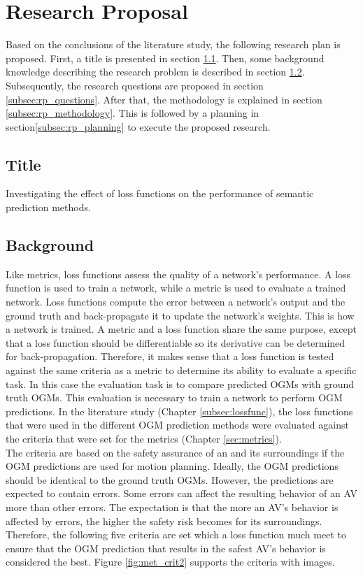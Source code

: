 \section{Research Proposal} \label{sec:res_prop}
Based on the conclusions of the literature study, the following research plan is proposed. First, a title is presented in section \ref{subsec:rp_title}. Then, some background knowledge describing the research problem is described in section \ref{subsec:rp_background}. Subsequently, the research questions are proposed in section \ref{subsec:rp_questions}. After that, the methodology is explained in section \ref{subsec:rp_methodology}. This is followed by a planning in section\ref{subsec:rp_planning} to execute the proposed research. 

\subsection{Title} \label{subsec:rp_title}
Investigating the effect of loss functions on the performance of semantic  prediction methods.

\subsection{Background} \label{subsec:rp_background}
Like metrics, loss functions assess the quality of a network's performance. A loss function is used to train a network, while a metric is used to evaluate a trained network. Loss functions compute the error between a network's output and the ground truth and back-propagate it to update the network's weights. This is how a network is trained. A metric and a loss function share the same purpose, except that a loss function should be differentiable so its derivative can be determined for back-propagation. Therefore, it makes sense that a loss function is tested against the same criteria as a metric to determine its ability to evaluate a specific task. In this case the evaluation task is to compare predicted \glspl{OGM} with ground truth \glspl{OGM}. This evaluation is necessary to train a network to perform \gls{OGM} predictions. In the literature study (Chapter \ref{subsec:lossfunc}), the loss functions that were used in the different \gls{OGM} prediction methods were evaluated against the criteria that were set for the metrics (Chapter \ref{sec:metrics}). \\

The criteria are based on the safety assurance of an  and its surroundings if the \gls{OGM} predictions are used for motion planning. Ideally, the \gls{OGM} predictions should be identical to the ground truth \glspl{OGM}. However, the predictions are expected to contain errors. Some errors can affect the resulting behavior of an \gls{AV} more than other errors. The expectation is that the more an \gls{AV}'s behavior is affected by errors, the higher the safety risk becomes for its surroundings. Therefore, the following five criteria are set which a loss function much meet to ensure that the \gls{OGM} prediction that results in the safest \gls{AV}'s behavior is considered the best. Figure \ref{fig:met_crit2} supports the criteria with images.

